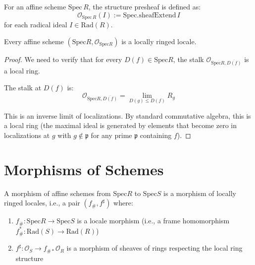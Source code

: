 \begin{definition}
  \label{def:structure-presheaf-affine}
  \leanok
  For an affine scheme $\mathrm{Spec}\, R$, the structure presheaf is defined as:
  $$\mathcal{O}_{\mathrm{Spec}\, R}(I) := \mathrm{Spec.sheafExtend}\, I$$
  for each radical ideal $I \in \mathrm{Rad}(R)$.
\end{definition}

\begin{theorem}
  \label{thm:affine-scheme-locally-ringed}
  \leanok
  Every affine scheme $(\mathrm{Spec} R, \mathcal{O}_{\mathrm{Spec} R})$ is a locally ringed locale.
\end{theorem}

\begin{proof}
  We need to verify that for every $D(f) \in \mathrm{Spec} R$, the stalk $\mathcal{O}_{\mathrm{Spec} R, \overline{D(f)}}$ is a local ring.
  
  The stalk at $D(f)$ is:
  $$\mathcal{O}_{\mathrm{Spec} R, \overline{D(f)}} = \lim_{D(g) \leq D(f)} R_g$$
  
  This is an inverse limit of localizations. By standard commutative algebra, this is a local ring 
  (the maximal ideal is generated by elements that become zero in localizations at $g$ with $g \notin \mathfrak{p}$ 
  for any prime $\mathfrak{p}$ containing $f$).
\end{proof}

\section{Morphisms of Schemes}

\begin{definition}
  \label{def:morphism-affine-schemes}
  \leanok
  A morphism of affine schemes from $\mathrm{Spec} R$ to $\mathrm{Spec} S$ is a morphism of locally ringed locales, 
  i.e., a pair $(f_{\#}, f^{\sharp})$ where:
  \begin{enumerate}
    \item $f_{\#}: \mathrm{Spec} R \to \mathrm{Spec} S$ is a locale morphism (i.e., a frame homomorphism $f_{\#}^*: \mathrm{Rad}(S) \to \mathrm{Rad}(R)$)
    \item $f^{\sharp}: \mathcal{O}_S \to f_{\#*} \mathcal{O}_R$ is a morphism of sheaves of rings respecting the local ring structure
  \end{enumerate}
\end{definition}

